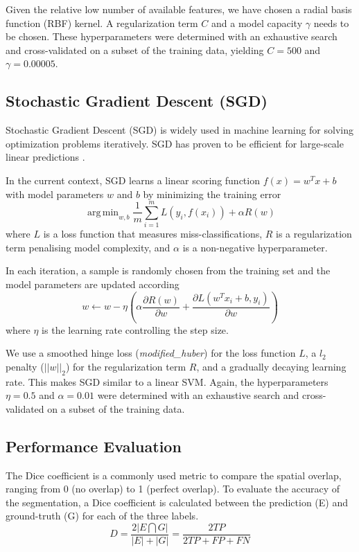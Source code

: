 \documentclass[journal]{IEEEtran}
\DeclareMathOperator*{\argmin}{arg\,min}
\begin{document}
Given the relative low number of available features, we have chosen a radial basis function (RBF) kernel. A regularization term $C$ and a model capacity $\gamma$ needs to be chosen. These hyperparameters were determined with an exhaustive search and cross-validated on a subset of the training data, yielding $C=500$ and $\gamma=0.00005$.

\subsection{Stochastic Gradient Descent (SGD)}
Stochastic Gradient Descent (SGD) is widely used in machine learning for solving optimization problems iteratively. SGD has proven to be efficient for large-scale linear predictions \cite{zhang2004solving}.

In the current context, SGD learns a linear scoring function $f(x) = w^Tx + b$ with model parameters $w$ and $b$ by minimizing the training error
\begin{equation}
\argmin_{w,b} \frac{1}{m}\sum_{i=1}^mL(y_i, f(x_i)) + \alpha R(w)
\end{equation}
where $L$ is a loss function that measures miss-classifications, $R$ is a regularization term penalising model complexity, and $\alpha$ is a non-negative hyperparameter.

In each iteration, a sample is randomly chosen from the training set and the model parameters are updated according
\begin{equation}
w \leftarrow w - \eta \left(\alpha \frac{\partial R(w)}{\partial w} + \frac{\partial L (w^Tx_i + b, y_i)}{\partial w} \right)
\end{equation}
where $\eta$ is the learning rate controlling the step size.

We use a smoothed hinge loss (\textit{modified\_huber}) for the loss function $L$, a $l_2$ penalty ($||w||_2$) for the regularization term $R$, and a gradually decaying learning rate. This makes SGD similar to a linear SVM. Again, the hyperparameters $\eta = 0.5$ and $\alpha = 0.01$ were determined with an exhaustive search and cross-validated on a subset of the training data.


\subsection{Performance Evaluation}\label{ch.eval}
The Dice coefficient is a commonly used metric to compare the spatial overlap, ranging from 0 (no overlap) to 1 (perfect overlap). To evaluate the accuracy of the segmentation, a Dice coefficient is calculated between the prediction (E) and ground-truth (G) for each of the three labels. 
\begin{equation}
D = \frac{2|E \bigcap G|}{|E| + |G|} = \frac{2 TP}{2 TP + FP + FN}
\end{equation}
\end{document}
